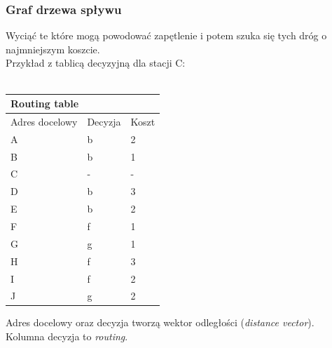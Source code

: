 \documentclass[a4paper,twoside]{article}
\begin{document}
			\subsubsection{Graf drzewa spływu}
				Wyciąć te które mogą powodować zapętlenie i potem szuka się tych dróg o najmniejszym koszcie.\\
				Przykład z tablicą decyzyjną dla stacji C:\\\\
				\begin{tabular}{ccc}
					\multicolumn{3}{l}{Routing table}                                                                                                  \\ \hline
					\multicolumn{1}{l|}{Adres docelowy}  & \multicolumn{1}{l|}{Decyzja}         & \multicolumn{1}{l}{Koszt}                            \\ \hline
					\multicolumn{1}{l|}{A} & \multicolumn{1}{l|}{b}                & \multicolumn{1}{l}{2}                           \\
					\multicolumn{1}{l|}{B} & \multicolumn{1}{l|}{b}                & \multicolumn{1}{l}{1}                           \\
					\multicolumn{1}{l|}{C} & \multicolumn{1}{l|}{-}                & \multicolumn{1}{l}{-}                           \\
					\multicolumn{1}{l|}{D} & \multicolumn{1}{l|}{b}                & \multicolumn{1}{l}{3}                           \\
					\multicolumn{1}{l|}{E} & \multicolumn{1}{l|}{b}                & \multicolumn{1}{l}{2}                           \\
					\multicolumn{1}{l|}{F} & \multicolumn{1}{l|}{f}                & \multicolumn{1}{l}{1}                           \\
					\multicolumn{1}{l|}{G} & \multicolumn{1}{l|}{g}                & \multicolumn{1}{l}{1}                           \\
					\multicolumn{1}{l|}{H} & \multicolumn{1}{l|}{f}                & \multicolumn{1}{l}{3}                           \\
					\multicolumn{1}{l|}{I} & \multicolumn{1}{l|}{f}                & \multicolumn{1}{l}{2}                           \\
					\multicolumn{1}{l|}{J} & \multicolumn{1}{l|}{g}                & \multicolumn{1}{l}{2}                            
				\end{tabular}
				Adres docelowy oraz decyzja tworzą wektor odległości (\emph{distance vector}).\\
				Kolumna decyzja to \emph{routing}.\\
\end{document}
